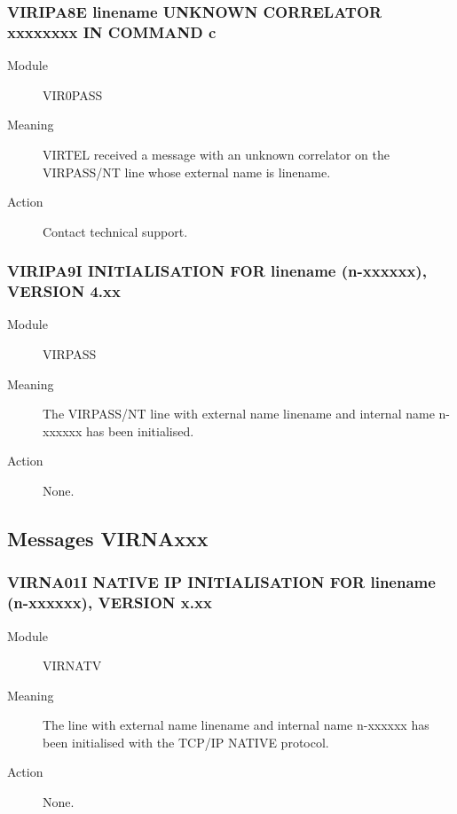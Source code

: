 \documentclass[letterpaper,10pt,english]{sphinxmanual}
\begin{document}
\subsubsection{VIRIPA8E linename UNKNOWN CORRELATOR xxxxxxxx IN COMMAND c}
\label{\detokenize{messages:viripa8e-linename-unknown-correlator-xxxxxxxx-in-command-c}}\begin{description}
\item[{Module}] \leavevmode
VIR0PASS

\item[{Meaning}] \leavevmode
VIRTEL received a message with an unknown correlator on the VIRPASS/NT line whose external name is linename.

\item[{Action}] \leavevmode
Contact technical support.

\end{description}


\subsubsection{VIRIPA9I INITIALISATION FOR linename (n-xxxxxx), VERSION 4.xx}
\label{\detokenize{messages:viripa9i-initialisation-for-linename-n-xxxxxx-version-4-xx}}\begin{description}
\item[{Module}] \leavevmode
VIRPASS

\item[{Meaning}] \leavevmode
The VIRPASS/NT line with external name linename and internal name n-xxxxxx has been initialised.

\item[{Action}] \leavevmode
None.

\end{description}


\subsection{Messages VIRNAxxx}
\label{\detokenize{messages:messages-virnaxxx}}

\subsubsection{VIRNA01I NATIVE IP INITIALISATION FOR linename (n-xxxxxx), VERSION x.xx}
\label{\detokenize{messages:virna01i-native-ip-initialisation-for-linename-n-xxxxxx-version-x-xx}}\begin{description}
\item[{Module}] \leavevmode
VIRNATV

\item[{Meaning}] \leavevmode
The line with external name linename and internal name n-xxxxxx has been initialised with the TCP/IP NATIVE protocol.

\item[{Action}] \leavevmode
None.

\end{description}
\end{document}
